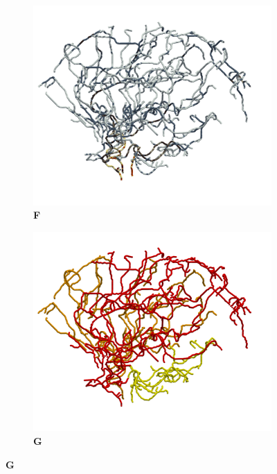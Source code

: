 \begin{figure}[t!]
\begin{subfigure}{0.32\textwidth}
\caption*{\bf F}
\vspace{-2em}
\includegraphics[width=\textwidth]{figures/arteries_radius_+x.png}
\end{subfigure}
\hfill
\begin{subfigure}{0.32\textwidth}
\caption*{\bf G}
\vspace{-2em}
\includegraphics[width=\textwidth]{figures/supply_node_proximity_trees_+x.png}
\end{subfigure}

\end{figure}
